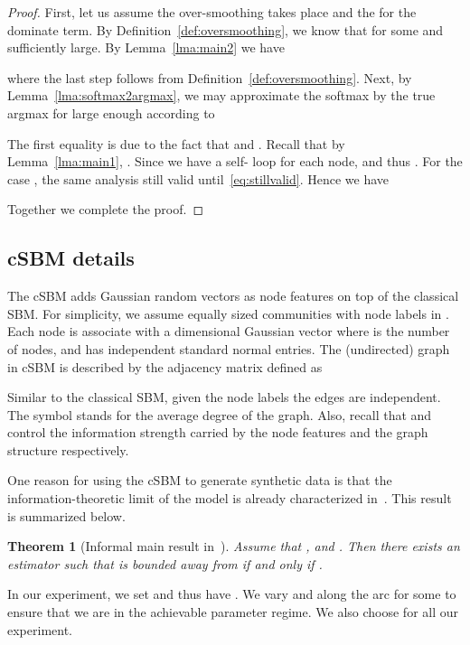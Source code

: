 \documentclass{article} \usepackage{iclr2021_conference,times}
\newtheorem{theorem}{Theorem}[section]
\begin{document}
\begin{proof}
 First, let us assume the over-smoothing takes place and the  for the dominate term. By Definition~\ref{def:oversmoothing}, we know that  for some  and  sufficiently large. By Lemma~\ref{lma:main2} we have

where the last step follows from Definition~\ref{def:oversmoothing}. Next, by Lemma~\ref{lma:softmax2argmax}, we may approximate the softmax by the true argmax for  large enough according to


The first equality is due to the fact that  and . Recall that by Lemma~\ref{lma:main1}, . Since we have a self- loop for each node,  and thus . For the case , the same analysis still valid until~\eqref{eq:stillvalid}. Hence we have

Together we complete the proof.


\end{proof}

\subsection{cSBM details}
The cSBM adds Gaussian random vectors as node features on top of the classical SBM. For simplicity, we assume  equally sized communities with node labels  in . Each node  is associate with a  dimensional Gaussian vector  where  is the number of nodes,  and  has independent standard normal entries. The (undirected) graph in cSBM is described by the adjacency matrix  defined as

Similar to the classical SBM, given the node labels the edges are independent. The symbol  stands for the average degree of the graph. Also, recall that  and  control the information strength carried by the node features and the graph structure respectively.

One reason for using the cSBM to generate synthetic data is that the information-theoretic limit of the model is already characterized in~\cite{deshpande2018contextual}. This result is summarized below.
\begin{theorem}[Informal main result in~\cite{deshpande2018contextual}]Assume that ,  and . Then there exists an estimator  such that  is bounded away from  if and only if .
\end{theorem}

In our experiment, we set   and thus have . We vary  and  along the arc  for some  to ensure that we are in the achievable parameter regime. We also choose  for all our experiment.
\end{document}
